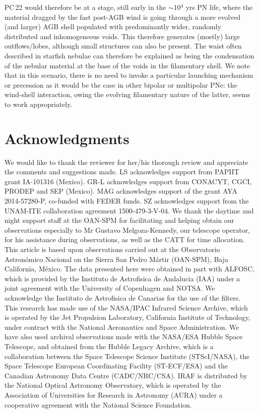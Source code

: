 \documentclass[fleqn,usenatbib,useAMS]{mnras}
\begin{document}
PC\,22 would therefore be at a stage, still early in the $\sim$10$^{4}$ yrs
PN life, where the material dragged by the fast post-AGB wind is going
through a more evolved (and larger) AGB shell populated with predominantly
wider, randomly distributed and inhomogeneous voids.
This therefore generates (mostly) large outflows/lobes, although small
structures can also be present.
The waist often described in starfish nebulae can therefore be explained
as being the condensation of the nebular material at the base of the voids
in the filamentary shell. We note that in this scenario, there is no need
to invoke a particular launching mechanism or precession as it would be
the case in other bipolar or multipolar PNe: the wind-shell interaction,
owing the evolving filamentary nature of the latter, seems to work
appropriately.





\section*{Acknowledgments}

We would like to thank the reviewer for her/his thorough review and appreciate the comments and suggestions made.
LS acknowledges support from PAPIIT grant IA-101316 (Mexico).
GR-L acknowledges support from CONACYT, CGCI, PRODEP and SEP (Mexico).
MAG acknowledges support of the grant AYA 2014-57280-P, co-funded with
FEDER funds. SZ acknowledges support from the UNAM-ITE collaboration agreement 1500-479-3-V-04.
We thank the daytime and night support staff at the OAN-SPM for facilitating and helping obtain our observations   especially to Mr Gustavo  Melgoza-Kennedy,  our telescope  operator, for his assistance during observations, as well as the CATT for time allocation. This article is based upon observations carried out at the Observatorio Astron\'omico Nacional on the Sierra San Pedro M\'artir (OAN-SPM), Baja California, M\'exico. The data presented here were obtained in part with ALFOSC, which is provided by the Instituto de Astrofisica de Andalucia (IAA) under a joint agreement with the University of Copenhagen and NOTSA. We acknowledge the Instituto de Astrofisica de Canarias for the use of the filters. This research has made use of the NASA/IPAC Infrared Science Archive, which is operated by the Jet Propulsion Laboratory, California Institute of Technology, under contract with the National Aeronautics and Space Administration. We have also used archival observations made with the NASA/ESA Hubble Space Telescope, and obtained from the Hubble Legacy Archive, which is a collaboration between the Space Telescope Science Institute (STScI/NASA), the Space Telescope European Coordinating Facility (ST-ECF/ESA) and the Canadian Astronomy Data Centre (CADC/NRC/CSA). {\sc IRAF} is distributed by the National Optical Astronomy Observatory, which is operated by the Association of Universities for Research in Astronomy (AURA) under a cooperative agreement with the National Science Foundation. 
\end{document}
